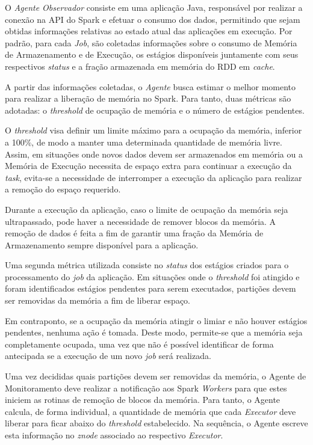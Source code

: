 O \textit{Agente Observador} consiste em uma aplicação Java, responsável por realizar a conexão na API do Spark e efetuar o consumo dos dados, permitindo que sejam obtidas informações relativas ao estado atual das aplicações em execução. Por padrão, para cada \textit{Job}, são coletadas informações sobre o consumo de Memória de Armazenamento e de Execução, os estágios disponíveis juntamente com seus respectivos \textit{status} e a fração armazenada em memória do RDD em \textit{cache}.

A partir das informações coletadas, o \textit{Agente} busca estimar o melhor momento para realizar a liberação de memória no Spark. Para tanto, duas métricas são adotadas: o \textit{threshold} de ocupação de memória e o número de estágios pendentes.

O \textit{threshold} visa definir um limite máximo para a ocupação da memória, inferior a 100\%, de modo a manter uma determinada quantidade de memória livre. Assim, em situações onde novos dados devem ser armazenados em memória ou a Memória de Execução necessita de espaço extra para continuar a execução da \textit{task}, evita-se a necessidade de interromper a execução da aplicação para realizar a remoção do espaço requerido. 

Durante a execução da aplicação, caso o limite de ocupação da memória seja ultrapassado, pode haver a necessidade de remover blocos da memória. A remoção de dados é feita a fim de garantir uma fração da Memória de Armazenamento sempre disponível para a aplicação.

Uma segunda métrica utilizada consiste no \textit{status} dos estágios criados para o processamento do \textit{job} da aplicação. Em situações onde o \textit{threshold} foi atingido e foram identificados estágios pendentes para serem executados, partições devem ser removidas da memória a fim de liberar espaço.

Em contraponto, se a ocupação da memória atingir o limiar e não houver estágios pendentes, nenhuma ação é tomada. Deste modo, permite-se que a memória seja completamente ocupada, uma vez que não é possível identificar de forma antecipada se a execução de um novo \textit{job} será realizada.

Uma vez decididas quais partições devem ser removidas da memória, o Agente de Monitoramento deve realizar a notificação aos Spark \textit{Workers} para que estes iniciem as rotinas de remoção de blocos da memória. Para tanto, o Agente calcula, de forma individual, a quantidade de memória que cada \textit{Executor} deve liberar para ficar abaixo do \textit{threshold} estabelecido. Na sequência, o Agente escreve esta informação no \textit{znode} associado ao respectivo \textit{Executor}. 


